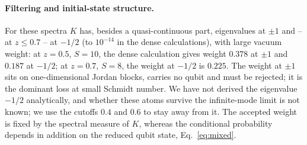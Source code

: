 \documentclass[11pt,a4paper]{article}
\begin{document}
\paragraph{Filtering and initial-state structure.}
For these spectra $K$ has, besides a quasi-continuous part, eigenvalues at $\pm1$ and -- at $z\le0.7$ -- at $-1/2$ (to $10^{-14}$ in the dense calculations), with large vacuum weight: at $z=0.5$, $S=10$, the dense calculation gives weight $0.378$ at $\pm1$ and $0.187$ at $-1/2$; at $z=0.7$, $S=8$, the weight at $-1/2$ is $0.225$. The weight at $\pm1$ sits on one-dimensional Jordan blocks, carries no qubit and must be rejected; it is the dominant loss at small Schmidt number. We have not derived the eigenvalue $-1/2$ analytically, and whether these atoms survive the infinite-mode limit is not known; we use the cutoffs $0.4$ and $0.6$ to stay away from it. The accepted weight is fixed by the spectral measure of $K$, whereas the conditional probability depends in addition on the reduced qubit state, Eq.~\eqref{eq:mixed}.
\end{document}
